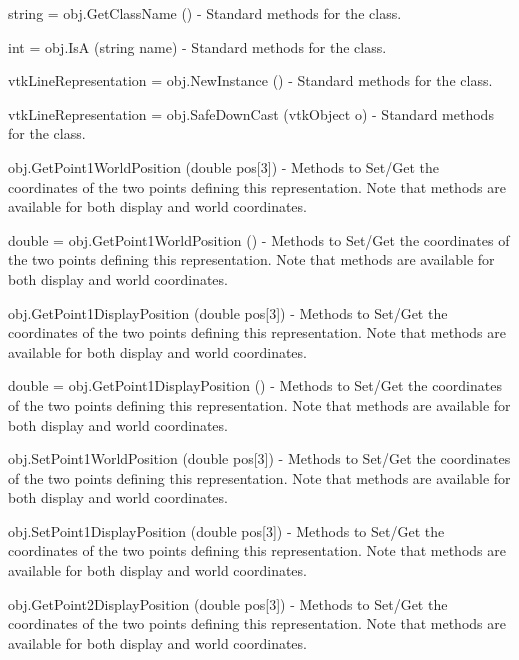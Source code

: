 \begin{DoxyItemize}
\item {\ttfamily string = obj.\-Get\-Class\-Name ()} -\/ Standard methods for the class.  
\item {\ttfamily int = obj.\-Is\-A (string name)} -\/ Standard methods for the class.  
\item {\ttfamily vtk\-Line\-Representation = obj.\-New\-Instance ()} -\/ Standard methods for the class.  
\item {\ttfamily vtk\-Line\-Representation = obj.\-Safe\-Down\-Cast (vtk\-Object o)} -\/ Standard methods for the class.  
\item {\ttfamily obj.\-Get\-Point1\-World\-Position (double pos\mbox{[}3\mbox{]})} -\/ Methods to Set/\-Get the coordinates of the two points defining this representation. Note that methods are available for both display and world coordinates.  
\item {\ttfamily double = obj.\-Get\-Point1\-World\-Position ()} -\/ Methods to Set/\-Get the coordinates of the two points defining this representation. Note that methods are available for both display and world coordinates.  
\item {\ttfamily obj.\-Get\-Point1\-Display\-Position (double pos\mbox{[}3\mbox{]})} -\/ Methods to Set/\-Get the coordinates of the two points defining this representation. Note that methods are available for both display and world coordinates.  
\item {\ttfamily double = obj.\-Get\-Point1\-Display\-Position ()} -\/ Methods to Set/\-Get the coordinates of the two points defining this representation. Note that methods are available for both display and world coordinates.  
\item {\ttfamily obj.\-Set\-Point1\-World\-Position (double pos\mbox{[}3\mbox{]})} -\/ Methods to Set/\-Get the coordinates of the two points defining this representation. Note that methods are available for both display and world coordinates.  
\item {\ttfamily obj.\-Set\-Point1\-Display\-Position (double pos\mbox{[}3\mbox{]})} -\/ Methods to Set/\-Get the coordinates of the two points defining this representation. Note that methods are available for both display and world coordinates.  
\item {\ttfamily obj.\-Get\-Point2\-Display\-Position (double pos\mbox{[}3\mbox{]})} -\/ Methods to Set/\-Get the coordinates of the two points defining this representation. Note that methods are available for both display and world coordinates.  

\end{DoxyItemize}
